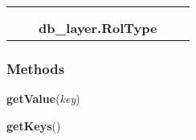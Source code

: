     \label{db_layer:RolType}
\begin{tabular}{cccccc}
\multicolumn{2}{r}{\settowidth{\BCL}{object}\multirow{2}{\BCL}{object}}
&&
  \\\cline{3-3}
  &&\multicolumn{1}{c|}{}
&&
  \\
&&\multicolumn{2}{l}{\textbf{db\_layer.RolType}}
\end{tabular}



  \subsubsection{Methods}

    \label{db_layer:RolType:getValue}

    \vspace{0.5ex}

\hspace{.8\funcindent}\begin{boxedminipage}{\funcwidth}

    \raggedright \textbf{getValue}(\textit{key})

\setlength{\parskip}{2ex}
\setlength{\parskip}{1ex}
    \end{boxedminipage}

    \label{db_layer:RolType:getKeys}

    \vspace{0.5ex}

\hspace{.8\funcindent}\begin{boxedminipage}{\funcwidth}

    \raggedright \textbf{getKeys}()

\setlength{\parskip}{2ex}
\setlength{\parskip}{1ex}
    \end{boxedminipage}

    \label{db_layer:RolType:getValues}


